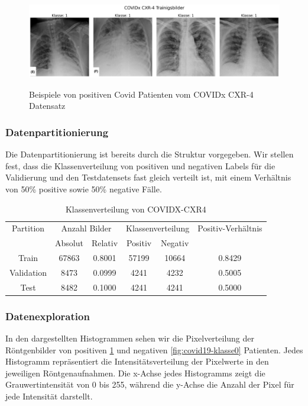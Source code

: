 \begin{figure}[H]
    \centering
    \includegraphics[width=\linewidth, height=4cm]{01-images/03-data/covid19-klasse1.png}
    \caption{Beispiele von positiven Covid Patienten vom COVIDx CXR-4 Datensatz}
    \label{fig:covid19-klasse1}
\end{figure}


\subsubsection{Datenpartitionierung} \label{chap:COVIDX-Partition}

Die Datenpartitionierung ist bereits durch die Struktur vorgegeben. Wir stellen fest, dass die Klassenverteilung von positiven und negativen Labels für die Validierung und den Testdatensets fast gleich verteilt ist, mit einem Verhältnis von 50\% positive sowie 50\% negative Fälle. 

\begin{table}[h]
\centering
\begin{tabular}{@{}cccccc@{}}
\toprule
Partition & \multicolumn{2}{c}{Anzahl Bilder} & \multicolumn{2}{c}{Klassenverteilung} & Positiv-Verhältnis\\ 
\cmidrule(lr){2-3} \cmidrule(lr){4-5} 
          & Absolut & Relativ & Positiv & Negativ & \\ 
\midrule
Train      & 67863 & 0.8001 & 57199 & 10664 & 0.8429 \\
Validation & 8473  & 0.0999 & 4241  & 4232  & 0.5005 \\
Test       & 8482  & 0.1000 & 4241  & 4241  & 0.5000 \\ 
\bottomrule
\end{tabular}
\caption{Klassenverteilung von COVIDX-CXR4}
\label{tab:covidx-klassenverteilung}
\end{table}

\subsubsection{Datenexploration}


In den dargestellten Histogrammen sehen wir die Pixelverteilung der Röntgenbilder von positiven \ref{fig:covid19-klasse1} und negativen \ref{fig:covid19-klasse0} Patienten. Jedes Histogramm repräsentiert die Intensitätsverteilung der Pixelwerte in den jeweiligen Röntgenaufnahmen. Die x-Achse jedes Histogramms zeigt die Grauwertintensität von 0 bis 255, während die y-Achse die Anzahl der Pixel für jede Intensität darstellt. 

